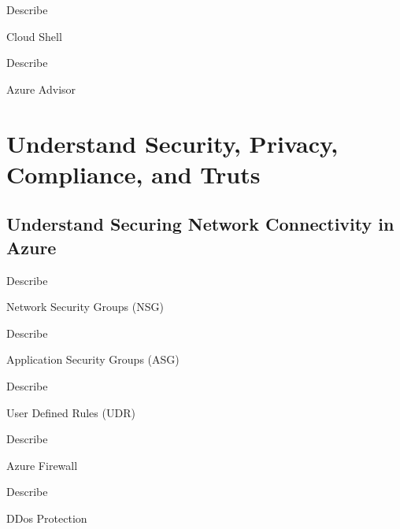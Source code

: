 \documentclass{scrartcl}
\newenvironment{flashcard}[2][]{%
    #1
    \vfill
    \centerline{\Large{#2}}
    \vfill
    \newpage
}
{\newpage}
\newcommand{\sectioncard}[1]{
    \vspace*{\stretch{1}}
    \section{#1}
    \vspace*{\stretch{1}}
    \pagebreak
}
\newcommand{\subsectioncard}[1]{
    \vspace*{\stretch{1}}
    \subsection{#1}
    \vspace*{\stretch{1}}
    \pagebreak
}
\begin{document}
    \begin{flashcard}[Describe]{Cloud Shell}

    \end{flashcard}

    \begin{flashcard}[Describe]{Azure Advisor}

    \end{flashcard}

    \sectioncard{Understand Security, Privacy, Compliance, and Truts}

    \subsectioncard{Understand Securing Network Connectivity in Azure}

    \begin{flashcard}[Describe]{Network Security Groups (NSG)}

    \end{flashcard}

    \begin{flashcard}[Describe]{Application Security Groups (ASG)}

    \end{flashcard}

    \begin{flashcard}[Describe]{User Defined Rules (UDR)}

    \end{flashcard}

    \begin{flashcard}[Describe]{Azure Firewall}

    \end{flashcard}

    \begin{flashcard}[Describe]{DDos Protection}

    \end{flashcard}
\end{document}
